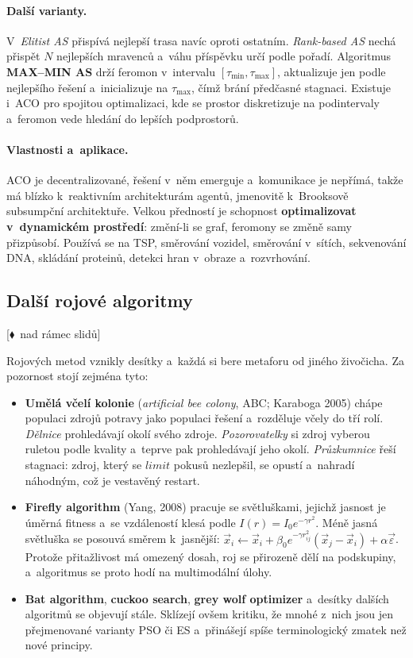 \documentclass[11pt,a4paper]{article}
\theoremstyle{definition}
\newcommand{\mimo}{\textcolor{markcol}{\textsf{\footnotesize[$\blacklozenge$~nad rámec slidů]}}}
\begin{document}
\paragraph{Další varianty.}
V~\emph{Elitist AS} přispívá nejlepší trasa navíc oproti ostatním. \emph{Rank-based AS} nechá
přispět $N$ nejlepších mravenců a~váhu příspěvku určí podle pořadí. Algoritmus
\textbf{MAX--MIN AS} drží feromon v~intervalu $[\tau_{\min}, \tau_{\max}]$, aktualizuje jen
podle nejlepšího řešení a~inicializuje na $\tau_{\max}$, čímž brání předčasné stagnaci.
Existuje i~ACO pro spojitou optimalizaci, kde se prostor diskretizuje na podintervaly
a~feromon vede hledání do lepších podprostorů.

\paragraph{Vlastnosti a~aplikace.} ACO je decentralizované, řešení v~něm emerguje
a~komunikace je nepřímá, takže má blízko k~reaktivním architekturám agentů, jmenovitě
k~Brooksově subsumpční architektuře. Velkou předností je schopnost \textbf{optimalizovat
v~dynamickém prostředí}: změní-li se graf, feromony se změně samy přizpůsobí. Používá se na
TSP, směrování vozidel, směrování v~sítích, sekvenování DNA, skládání proteinů, detekci hran
v~obraze a~rozvrhování.

\subsection{Další rojové algoritmy}

\noindent\mimo{}

Rojových metod vznikly desítky a~každá si bere metaforu od jiného živočicha. Za pozornost
stojí zejména tyto:
\begin{itemize}
\item \textbf{Umělá včelí kolonie} (\emph{artificial bee colony}, ABC;
  Karaboga 2005) chápe populaci zdrojů potravy jako populaci řešení a~rozděluje včely do tří
  rolí. \emph{Dělnice} prohledávají okolí svého zdroje. \emph{Pozorovatelky} si zdroj vyberou
  ruletou podle kvality a~teprve pak prohledávají jeho okolí. \emph{Průzkumnice} řeší
  stagnaci: zdroj, který se $limit$ pokusů nezlepšil, se opustí a~nahradí náhodným, což je
  vestavěný restart.
\item \textbf{Firefly algorithm} (Yang, 2008) pracuje se světluškami, jejichž jasnost je
  úměrná fitness a~se vzdáleností klesá podle
  $I(r) = I_0 e^{-\gamma r^2}$. Méně jasná světluška se posouvá směrem
  k~jasnější:
  $\vec x_i \gets \vec x_i + \beta_0 e^{-\gamma r_{ij}^2}(\vec x_j - \vec x_i)
  + \alpha \vec\varepsilon$. Protože přitažlivost má omezený dosah, roj se přirozeně dělí na
  podskupiny, a~algoritmus se proto hodí na multimodální úlohy.
\item \textbf{Bat algorithm}, \textbf{cuckoo search}, \textbf{grey wolf
  optimizer} a~desítky dalších  algoritmů se objevují stále. Sklízejí ovšem
  kritiku, že mnohé z~nich jsou jen přejmenované varianty PSO či ES a~přinášejí spíše
  terminologický zmatek než nové principy.
\end{itemize}
\end{document}
